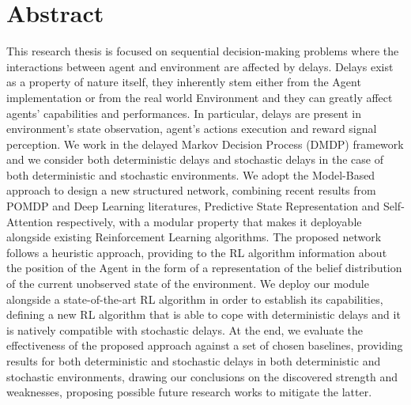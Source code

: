 \chapter*{Abstract}
This research thesis is focused on sequential decision-making
problems where the interactions between agent and environment are affected by delays. Delays exist as a property of nature itself, they inherently stem either from the Agent implementation or from the real world Environment and they can greatly affect agents' capabilities and performances. In particular, delays are present in environment's state observation, agent's actions execution and reward signal perception. We work in the delayed Markov Decision Process (DMDP) framework and we consider both deterministic delays and stochastic delays in the case of both deterministic and stochastic environments. We adopt the Model-Based approach to design a new structured network, combining recent results from POMDP and Deep Learning literatures, Predictive State Representation and Self-Attention respectively, with a modular property that makes it deployable alongside existing Reinforcement Learning algorithms. The proposed network follows a heuristic approach, providing to the RL algorithm information about the position of the Agent in the form of a representation of the belief distribution of the current unobserved state of the environment. We deploy our module alongside a state-of-the-art RL algorithm in order to establish its capabilities, defining a new RL algorithm that is able to cope with deterministic delays and it is natively compatible with stochastic delays. At the end, we evaluate the effectiveness of the proposed approach against a set of chosen baselines, providing results for both deterministic and stochastic delays in both deterministic and stochastic environments, drawing our conclusions on the discovered strength and weaknesses, proposing possible future research works to mitigate the latter.